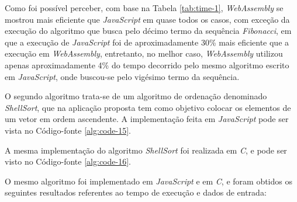 Como foi possível perceber, com base na Tabela \ref{tab:time-1}, \textit{WebAssembly} se
mostrou mais eficiente que \textit{JavaScript} em quase todos os casos, com exceção da
execução do algoritmo que busca pelo décimo termo da sequência \textit{Fibonacci}, em que
a execução de \textit{JavaScript} foi de aproximadamente 30\% mais eficiente que a
execução em \textit{WebAssembly}, entretanto, no melhor caso, \textit{WebAssembly}
utilizou apenas aproximadamente 4\% do tempo decorrido pelo mesmo algoritmo escrito em
\textit{JavaScript}, onde buscou-se pelo vigésimo termo da sequência.

O segundo algoritmo trata-se de um algoritmo de ordenação denominado \textit{ShellSort},
que na aplicação proposta tem como objetivo colocar os elementos de um vetor em ordem
ascendente. A implementação feita em \textit{JavaScript} pode ser vista no
Código-fonte \ref{alg:code-15}.



A mesma implementação do algoritmo \textit{ShellSort} foi realizada em \textit{C}, e pode
ser visto no Código-fonte \ref{alg:code-16}.



O mesmo algoritmo foi implementado em \textit{JavaScript} e em \textit{C}, e foram obtidos
os seguintes resultados referentes ao tempo de execução e dados de entrada:

\begin{table}[ht]
\end{table}

